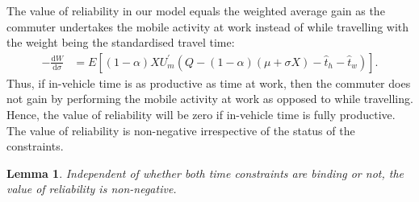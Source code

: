 \documentclass[12pt,a4paper,british]{article}
\newtheorem{lemma}{Lemma}[section]
\begin{document}
The value of reliability in our model equals the weighted average gain as the commuter undertakes the mobile activity at work instead of while travelling with the weight being the standardised travel time:
\begin{align*}
-\frac{\mathrm{d}W}{\mathrm{d}\sigma} & =E\left[\left( 1 - \alpha \right) X U_{m}^{\prime} \left(Q - \left(1 - \alpha\right) \left(\mu + \sigma X \right) - \hat{t}_{h} - \hat{t}_{w}\right)\right].
\end{align*}
Thus, if in-vehicle time is as productive as time at work, then the commuter does not gain by performing the mobile activity at work as opposed to while travelling. Hence, the value of reliability will be zero if in-vehicle time is fully productive. The value of reliability is non-negative irrespective of the status of the constraints.


\begin{lemma}
Independent of whether both time constraints are binding or not, the value of reliability is non-negative. 
\end{lemma}
\end{document}
